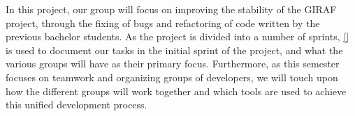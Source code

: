 In this project, our group will focus on improving the stability of the GIRAF
project, through the fixing of bugs and refactoring of code written by
the previous bachelor students. As the project is divided into a number of
sprints, \autoref{} is used to document our tasks in the initial sprint of the
project, and what the various groups will have as their primary focus.
Furthermore, as this semester focuses on teamwork and organizing groups of
developers, we will touch upon how the different groups will work together and
which tools are used to achieve this unified development process.
